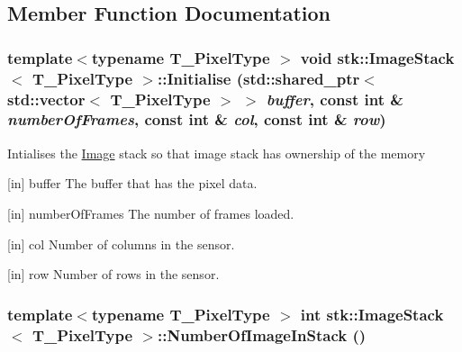 \subsection{Member Function Documentation}
\hypertarget{classstk_1_1ImageStack_a67adffe6f651996e3c025fa0d89fc14c}{
\subsubsection[{Initialise}]{\setlength{\rightskip}{0pt plus 5cm}template$<$typename T\_\-PixelType $>$ void {\bf stk::ImageStack}$<$ T\_\-PixelType $>$::Initialise (std::shared\_\-ptr$<$ std::vector$<$ T\_\-PixelType $>$ $>$ {\em buffer}, \/  const int \& {\em numberOfFrames}, \/  const int \& {\em col}, \/  const int \& {\em row})}}
\label{classstk_1_1ImageStack_a67adffe6f651996e3c025fa0d89fc14c}
Intialises the \hyperlink{classstk_1_1Image}{Image} stack so that image stack has ownership of the memory \begin{DoxyParagraph}{\mbox{[}in\mbox{]} buffer The buffer that has the pixel data.}

\end{DoxyParagraph}
\begin{DoxyParagraph}{\mbox{[}in\mbox{]} numberOfFrames The number of frames loaded.}

\end{DoxyParagraph}
\begin{DoxyParagraph}{\mbox{[}in\mbox{]} col Number of columns in the sensor.}

\end{DoxyParagraph}
\begin{DoxyParagraph}{\mbox{[}in\mbox{]} row Number of rows in the sensor.}

\end{DoxyParagraph}
\hypertarget{classstk_1_1ImageStack_af3e54a635f493de7f33e492ccb74372c}{
\subsubsection[{NumberOfImageInStack}]{\setlength{\rightskip}{0pt plus 5cm}template$<$typename T\_\-PixelType $>$ int {\bf stk::ImageStack}$<$ T\_\-PixelType $>$::NumberOfImageInStack ()}}
